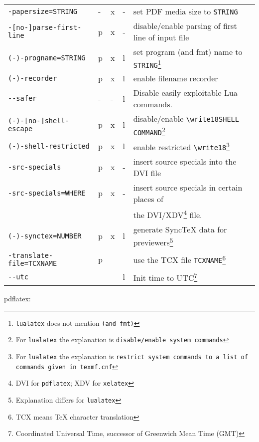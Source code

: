 \documentclass[a4paper, english]{article}%
\newcommand{\pdflatex}{\texttt{pdflatex}}
\newcommand{\lualatex}{\texttt{lualatex}}
\newcommand{\xelatex}{\texttt{xelatex}}
\begin{document}
{\begin{longtable}{|lllll|}
\texttt{-papersize=STRING}         & -&x&- & set PDF media size to \texttt{STRING} \\        
\texttt{-[no-]parse-first-line}    & p&x&- & disable/enable parsing of first line of input file \\
\texttt{(-)-progname=STRING}       & p&x&l & set program (and fmt) name to \texttt{STRING}\footnote%
{\lualatex{} does not mention \texttt{(and fmt)}} \\
\texttt{(-)-recorder}              & p&x&l & enable filename recorder \\
\texttt{-{}-safer}                 & -&-&l & Disable easily exploitable Lua commands. \\
\texttt{(-)-[no-]shell-escape}     & p&x&l & disable/enable \texttt{\textbackslash{}write18{SHELL COMMAND}}\footnote%
{For \lualatex{} the explanation is \texttt{disable/enable system commands}} \\
\texttt{(-)-shell-restricted}      & p&x&l & enable restricted \texttt{\textbackslash{}write18}\footnote%
{For \lualatex{} the explanation is \texttt{restrict system commands to a list of commands given in texmf.cnf}} \\
\texttt{-src-specials}             & p&x&- & insert source specials into the DVI file \\
\texttt{-src-specials=WHERE}       & p&x&- & insert source specials in certain places of \\
                                   &  & &  & the DVI/XDV\footnote{DVI for \pdflatex; XDV for \xelatex} file. \\
\texttt{(-)-synctex=NUMBER}        & p&x&l & generate SyncTeX data for previewers\footnote%
{Explanation differs for \lualatex} \\ 
\texttt{-translate-file=TCXNAME}   & p& &  & use the TCX file \texttt{TCXNAME}\footnote%
{TCX means \TeX{} character translation} \\
\texttt{-{}-utc}                   &  & &l & Init time to UTC\footnote{Coordinated Universal Time, 
successor of Greenwich Mean Time (GMT)} \\
\end{longtable}
} %





pdflatex: 
\end{document}
